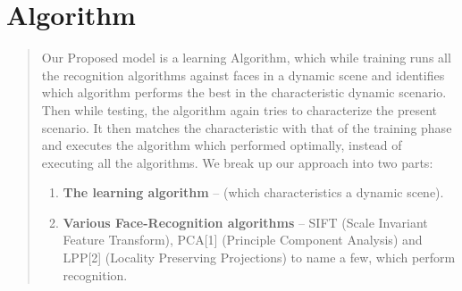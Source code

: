 \section*{Algorithm}
\begin{quote}
Our Proposed model is a learning Algorithm, which while training runs all the recognition algorithms against faces in a dynamic scene and identifies which algorithm performs the best in the characteristic dynamic scenario. Then while testing, the algorithm again tries to characterize the present scenario. It then matches the characteristic with that of the training phase and executes the algorithm which performed optimally, instead of executing all the algorithms.
We break up our approach into two parts:
\begin{enumerate}
\item{\textbf{The learning algorithm} -- (which characteristics a dynamic scene).}
\item{\textbf{Various Face-Recognition algorithms} -- SIFT (Scale Invariant Feature Transform), PCA[1] (Principle Component Analysis) and LPP[2] (Locality Preserving Projections) to name a few, which perform recognition.}
\end{enumerate}
\end{quote}
